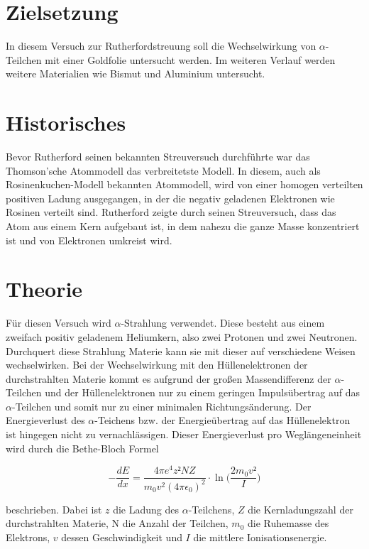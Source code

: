 \section{Zielsetzung}
In diesem Versuch zur Rutherfordstreuung soll die Wechselwirkung von $\alpha$-Teilchen mit einer Goldfolie untersucht werden.
Im weiteren Verlauf werden weitere Materialien wie Bismut und Aluminium untersucht.

\section{Historisches}
Bevor Rutherford seinen bekannten Streuversuch durchführte war das Thomson'sche Atommodell das verbreitetste Modell. In diesem,
auch als Rosinenkuchen-Modell bekannten Atommodell, wird von einer homogen verteilten positiven Ladung ausgegangen, in der die
negativ geladenen Elektronen wie Rosinen verteilt sind. Rutherford zeigte durch seinen Streuversuch, dass das Atom aus einem
Kern aufgebaut ist, in dem nahezu die ganze Masse konzentriert ist und von Elektronen umkreist wird.

\section{Theorie}
Für diesen Versuch wird $\alpha$-Strahlung verwendet. Diese besteht aus einem zweifach positiv geladenem Heliumkern, also
zwei Protonen und zwei Neutronen. Durchquert  diese Strahlung Materie kann sie mit dieser auf verschiedene Weisen wechselwirken.
Bei der Wechselwirkung mit den Hüllenelektronen der durchstrahlten Materie kommt es aufgrund der großen Massendifferenz der
$\alpha$-Teilchen und der Hüllenelektronen nur zu einem geringen Impulsübertrag auf das $\alpha$-Teilchen und somit nur zu einer
minimalen Richtungsänderung. Der Energieverlust des $\alpha$-Teichens bzw. der Energieübertrag auf das Hüllenelektron ist
hingegen nicht zu vernachlässigen. Dieser Energieverlust pro Weglängeneinheit wird durch die Bethe-Bloch Formel

\begin{equation}
  -\frac{dE}{dx}=\frac{4\pi e^4 z²NZ}{m_0 v^2 (4\pi \epsilon_0)^2}\cdot\ln\Bigg(\frac{2m_0 v²}{I}\Bigg)
  \label{eqn:BetheBloch}
\end{equation}

beschrieben.
Dabei ist $z$ die Ladung des $\alpha$-Teilchens, $Z$ die Kernladungszahl der durchstrahlten Materie, N die Anzahl der
Teilchen, %
$m_0$ die Ruhemasse des Elektrons, $v$ dessen Geschwindigkeit und $I$ die mittlere
Ionisationsenergie.

